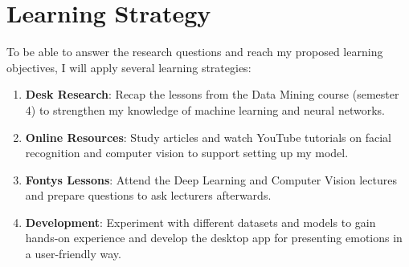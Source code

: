 \documentclass[12pt,a4paper]{article}
\begin{document}
\section{Learning Strategy}
To be able to answer the research questions and reach my proposed learning objectives, I will apply several learning strategies:
\begin{enumerate}
\item \textbf{Desk Research}: Recap the lessons from the Data Mining course (semester 4) to strengthen my knowledge of machine learning and neural networks.
\item \textbf{Online Resources}: Study articles and watch YouTube tutorials on facial recognition and computer vision to support setting up my model.
\item \textbf{Fontys Lessons}: Attend the Deep Learning and Computer Vision lectures and prepare questions to ask lecturers afterwards.
\item \textbf{Development}: Experiment with different datasets and models to gain hands-on experience and develop the desktop app for presenting emotions in a user-friendly way.

\end{enumerate}
\end{document}
